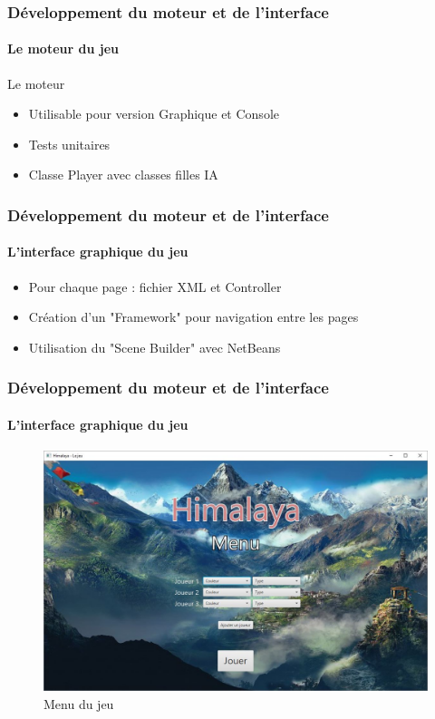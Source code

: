	\begin{frame}
		\frametitle{Développement du moteur et de l'interface}
		\framesubtitle{Le moteur du jeu}
		\begin{block}{Le moteur}
			\begin{itemize}
				\item Utilisable pour version Graphique et Console
				\item Tests unitaires
				\item Classe Player avec classes filles IA
			\end{itemize}
		\end{block}	
	\end{frame}

	\begin{frame}
		\frametitle{Développement du moteur et de l'interface}
		\framesubtitle{L'interface graphique du jeu}
		\begin{block}{\fx}
			\begin{itemize}
				\item Pour chaque page : fichier XML et Controller 
				\item Création d'un "Framework" pour navigation entre les pages
				\item Utilisation du "Scene Builder" avec NetBeans
			\end{itemize}
		\end{block}	
	\end{frame}
	
	\begin{frame}
		\frametitle{Développement du moteur et de l'interface}
		\framesubtitle{L'interface graphique du jeu}
		\begin{figure}[h]
			\centering
			\includegraphics[width=0.8\linewidth]{images/menu}
			\caption{Menu du jeu}
			\label{fig:menu}
		\end{figure}
	\end{frame}
	
